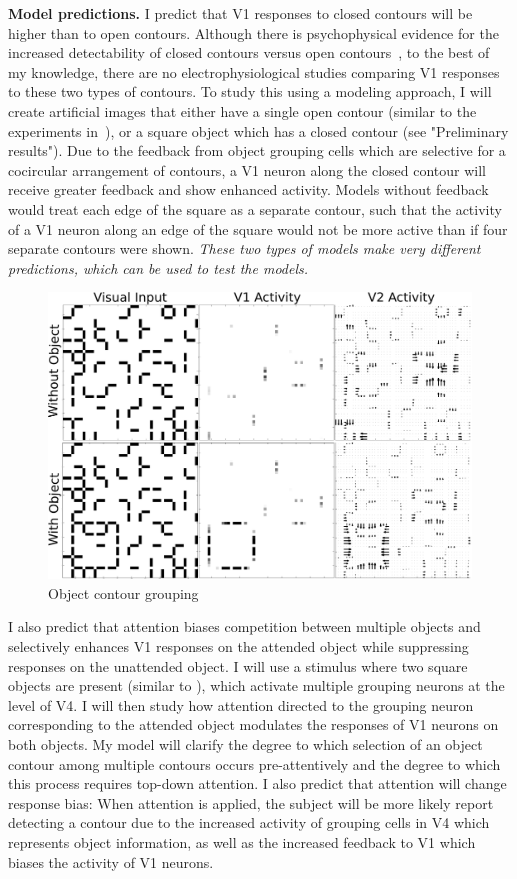 \documentclass[11pt]{article}
\begin{document}
\textbf{Model predictions.}
I predict that V1 responses to closed contours will be higher than to
open contours. Although there is psychophysical evidence for the
increased detectability of closed contours versus open
contours~\citep{Kovacs_Julesz93}, to the best of my knowledge, there
are no electrophysiological studies comparing V1 responses to these
two types of contours. To study this
%
using a modeling approach, 
I will create artificial images that either have a single open contour (similar to the experiments in~\citet{Chen_etal14}), or a square object which has a closed contour
(see "Preliminary results"). Due to the feedback from object grouping
cells which are selective for a cocircular arrangement of contours, a
V1 neuron along the closed contour will receive greater feedback and
show enhanced activity. Models without feedback would treat each edge
of the square as a separate contour, such that the activity of a V1
neuron along an edge of the square would not be more active than if
four separate contours were shown. {\em These two types of models make very different predictions, which can be used to test the models.}

\begin{figure}
  \vspace{-10pt}
  \centering 
  \includegraphics[width=.45\textwidth]{figs/contour_revised}
  \caption{Object contour grouping} 
  \vspace{-5pt}
  \label{fig:ContourGrouping}
\end{figure}

I also predict that attention biases competition between
multiple objects and selectively enhances V1 responses on the attended
object while suppressing responses on the unattended object. I will use a stimulus where two square objects are present
(similar to \citep{Qiu_etal07}), which activate multiple grouping
neurons at the level of V4. I will then study how attention directed
to the grouping neuron corresponding to the attended object modulates
the responses of V1 neurons on both objects. 
My model will clarify the degree to which selection of an object contour among multiple contours
occurs pre-attentively and the degree to which this process
requires top-down attention. I also predict that attention will change
response bias: When attention is applied, the subject will
be more likely report detecting a contour due to the increased
activity of grouping cells in V4 which represents object information,
as well as the increased feedback to V1 which biases the activity of
V1 neurons.
\end{document}
